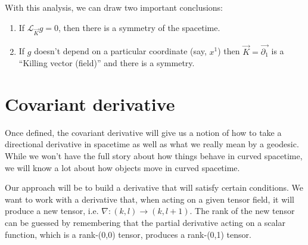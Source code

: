 \documentclass[10pt]{article}
\begin{document}
    With this analysis, we can draw two important conclusions:
    \begin{enumerate}
        \item If $\mathcal{L}_{\vec{K}} g = 0$, then there is a symmetry of the spacetime.
        \item If $g$ doesn't depend on a particular coordinate (say, $x^1$) then $\vec{K} = \vec{\partial_1}$ is a ``Killing vector (field)'' and there is a symmetry.
    \end{enumerate}
    
    \section{Covariant derivative}
    
    Once defined, the covariant derivative will give us a notion of how to take a directional derivative in spacetime as well as what we really mean by a geodesic. While we won't have the full story about how things behave in curved spacetime, we will know a lot about how objects move in curved spacetime.
    
    Our approach will be to build a derivative that will satisfy certain conditions. We want to work with a derivative that, when acting on a given tensor field, it will produce a new tensor, i.e. $\nabla: (k,l) \rightarrow (k,l+1)$. The rank of the new tensor can be guessed by remembering that the partial derivative acting on a scalar function, which is a rank-(0,0) tensor, produces a rank-(0,1) tensor.
    
\end{document}
